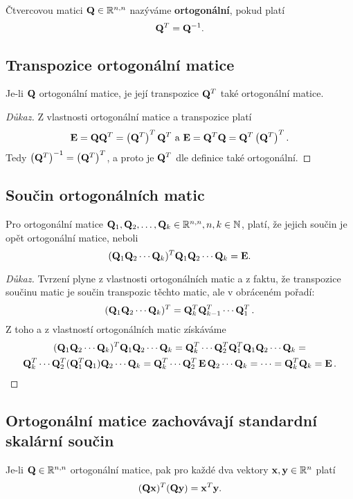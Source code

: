 Čtvercovou matici $\mathbf{Q}\in\mathbb{R}^{n,n}$ nazýváme \textbf{ortogonální}, pokud platí
\[ \mathbf{Q}^T = \mathbf{Q}^{-1}. \]

\subsection*{Transpozice ortogonální matice}

Je-li $\mathbf{Q}$ ortogonální matice, je její transpozice $\mathbf{Q}^T$ také ortogonální
matice.

\begin{proof}[Důkaz]
	Z vlastnosti ortogonální matice a transpozice platí
	\[ \mathbf{E}=\mathbf{Q}\mathbf{Q}^T = \left(\mathbf{Q}^T\right)^T\mathbf{Q}^T  \text{ a } \mathbf{E}=\mathbf{Q}^T\mathbf{Q} = \mathbf{Q}^T\left(\mathbf{Q}^T\right)^T. \]
	Tedy $\left(\mathbf{Q}^T\right)^{-1}=\left(\mathbf{Q}^T\right)^T$, a proto je $\mathbf{Q}^T$ dle
	definice také ortogonální.
\end{proof}

\subsection*{Součin ortogonálních matic}

Pro ortogonální matice $\mathbf{Q}_1, \mathbf{Q}_2, \ldots, \mathbf{Q}_k \in \mathbb{R}^{n,n}, n,k \in \mathbb{N}$,
platí, že jejich součin je opět ortogonální matice, neboli
\[ (\mathbf{Q}_1\mathbf{Q}_2 \cdots \mathbf{Q}_k)^T\mathbf{Q}_1\mathbf{Q}_2 \cdots \mathbf{Q}_k = \mathbf{E}. \]

\begin{proof}[Důkaz]
	Tvrzení plyne z vlastnosti ortogonálních matic a z faktu, že transpozice součinu matic je součin transpozic těchto matic, ale v obráceném pořadí:
	\[ (\mathbf{Q}_1\mathbf{Q}_2 \cdots\mathbf{Q}_k)^T = \mathbf{Q}_k^T\mathbf{Q}_{k-1}^T \cdots\mathbf{Q}_1^T\,. \]
	Z toho a z vlastností ortogonálních matic získáváme
	\begin{gather*}
		(\mathbf{Q}_1\mathbf{Q}_2 \cdots\mathbf{Q}_k)^T\mathbf{Q}_1\mathbf{Q}_2 \cdots\mathbf{Q}_k = \mathbf{Q}_k^T \cdots\mathbf{Q}_2^T\mathbf{Q}_1^T\mathbf{Q}_1\mathbf{Q}_2 \cdots\mathbf{Q}_k = \\
		\mathbf{Q}_k^T \cdots\mathbf{Q}_2^T(\mathbf{Q}_1^T\mathbf{Q}_1)\mathbf{Q}_2 \cdots\mathbf{Q}_k =
		\mathbf{Q}_k^T \cdots\mathbf{Q}_2^T\,\mathbf{E}\,\mathbf{Q}_2 \cdots\mathbf{Q}_k = \cdots = \mathbf{Q}_k^T\mathbf{Q}_k =\mathbf{E}\,.
	\end{gather*}
\end{proof}

\subsection*{Ortogonální matice zachovávají standardní skalární součin}

Je-li $\mathbf{Q} \in \mathbb{R}^{n,n}$ ortogonální matice, pak pro každé dva vektory $\mathbf{x},
	\mathbf{y} \in \mathbb{R}^n$ platí
\[ (\mathbf{Q}\mathbf{x})^T(\mathbf{Q}\mathbf{y}) = \mathbf{x}^T \mathbf{y}. \]

